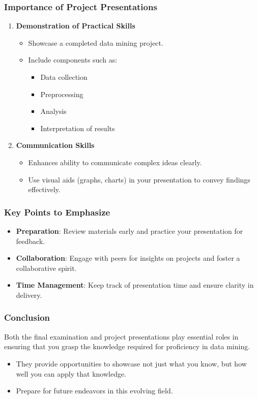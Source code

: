 \documentclass[aspectratio=169]{beamer}
\begin{document}
\begin{frame}[fragile]
    \frametitle{Importance of Project Presentations}
    \begin{enumerate}
        \item \textbf{Demonstration of Practical Skills}
        \begin{itemize}
            \item Showcase a completed data mining project.
            \item Include components such as:
            \begin{itemize}
                \item Data collection
                \item Preprocessing
                \item Analysis
                \item Interpretation of results
            \end{itemize}
        \end{itemize}

        \item \textbf{Communication Skills}
        \begin{itemize}
            \item Enhances ability to communicate complex ideas clearly.
            \item Use visual aids (graphs, charts) in your presentation to convey findings effectively.
        \end{itemize}
    \end{enumerate}
\end{frame}

\begin{frame}[fragile]
    \frametitle{Key Points to Emphasize}
    \begin{itemize}
        \item \textbf{Preparation}: Review materials early and practice your presentation for feedback.
        \item \textbf{Collaboration}: Engage with peers for insights on projects and foster a collaborative spirit.
        \item \textbf{Time Management}: Keep track of presentation time and ensure clarity in delivery.
    \end{itemize}
\end{frame}

\begin{frame}[fragile]
    \frametitle{Conclusion}
    Both the final examination and project presentations play essential roles in ensuring that you grasp the knowledge required for proficiency in data mining. 
    \begin{itemize}
        \item They provide opportunities to showcase not just what you know, but how well you can apply that knowledge.
        \item Prepare for future endeavors in this evolving field.
    \end{itemize}
\end{frame}
\end{document}
